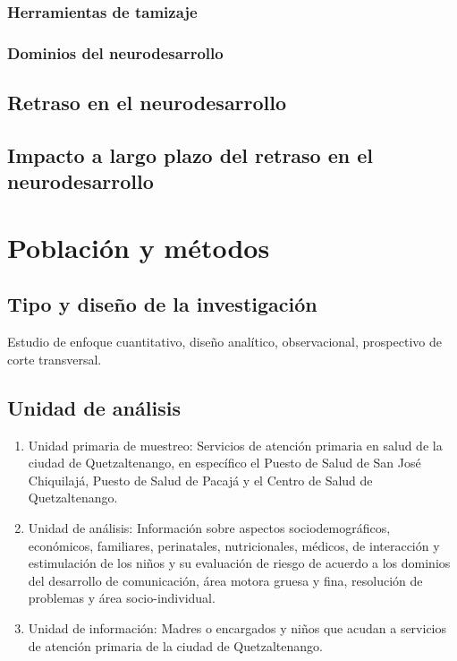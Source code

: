 \documentclass[11pt,letterpaper]{report}
\begin{document}
\subsection{Herramientas de tamizaje}
\subsection{Dominios del neurodesarrollo}

\section{Retraso en el neurodesarrollo}
\section{Impacto a largo plazo del retraso en el neurodesarrollo}

	\chapter{Población y métodos}
\section{Tipo y diseño de la investigación}
Estudio de enfoque cuantitativo, diseño analítico, observacional, prospectivo
de corte transversal.

\section{Unidad de análisis}
	\begin{enumerate}
		\item Unidad primaria de muestreo: Servicios de atención primaria en
		salud de la ciudad de Quetzaltenango, en específico el Puesto de
		Salud de San José Chiquilajá, Puesto de Salud de Pacajá y el Centro de
		Salud de Quetzaltenango.
		\item Unidad de análisis: Información sobre aspectos sociodemográficos,
		económicos, familiares, perinatales, nutricionales, médicos, de
		interacción y estimulación de los niños y su evaluación de riesgo de
		acuerdo a los dominios del desarrollo de comunicación, área motora
		gruesa y fina, resolución de problemas y área socio-individual.
		\item Unidad de información: Madres o encargados y niños que acudan a
		servicios de atención primaria de la ciudad de Quetzaltenango.
	\end{enumerate}
\end{document}
